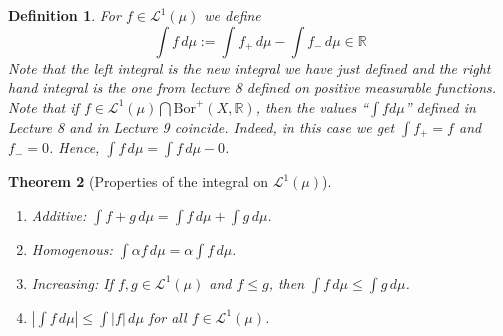 \documentclass[letterpaper, 12pt]{article}
\newcommand{\cL}{\mathcal{L}}
\newcommand{\bR}{\mathbb{R}}
\newcommand{\Bor}{\mathrm{Bor}}
\providecommand{\abs}[1]{\left\lvert#1\right\rvert}
\theoremstyle{stdthm}
\newtheorem{thm}{Theorem}[section]
\theoremstyle{stddef}
\newtheorem{defn}[thm]{Definition}
\theoremstyle{stdnonum}
\theoremstyle{stdqands}
\theoremstyle{stdbold}
\begin{document}
\begin{defn}
For $f \in \cL^1(\mu)$ we define 
\[
\int f \, d\mu := \int f_{+} \, d\mu - \int f_{-}\, d\mu \in \bR
\]
Note that the left integral is the new integral we have just defined and the right hand integral is the one from lecture 8 defined on positive measurable functions. Note that if $f \in \cL^1(\mu) \bigcap \Bor^+(X,\bR)$, then the values ``$\int f d\mu$'' defined in Lecture 8 and in Lecture 9 coincide. Indeed, in this case we get $\int f_+ = f$ and $f_{-} = 0$. Hence, $\int f \, d\mu = \int f \, d\mu - 0$. 
\end{defn}

\begin{thm} [Properties of the integral on $\cL^1(\mu)$] $ $
\begin{enumerate}
\item Additive: $\int f + g \, d\mu = \int f \, d\mu + \int g \, d\mu$.
\item Homogenous: $\int \alpha f \, d\mu = \alpha \int f \, d\mu$.
\item Increasing:  If $f,g \in \cL^1(\mu)$ and $f\leq g$, then $\int f \, d\mu \leq \int g \, d\mu$.
\item $\abs{\int f \, d\mu} \leq \int |f| \, d\mu$ for all $f \in \cL^1(\mu)$. 
\end{enumerate}
\end{thm}
\end{document}
